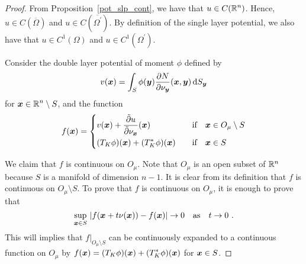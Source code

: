 \begin{proof}
From Proposition~\ref{pot_slp_cont}, we have that
$\displaystyle u \in C(\mathbb{R}^n)$.
Hence, $u \in C(\overline{\Omega})$ and
$\displaystyle u \in C(\overline{\Omega^{\prime}})$.  By definition of
the single layer potential, we also have that
$\displaystyle u \in C^1(\Omega)$ and
$\displaystyle u \in C^1(\Omega^{\prime})$.

Consider the double layer potential of moment $\phi$ defined by
\[
v({\bm{x}}) = \int_S \phi({\bm{y}})
\frac{\partial{N}}{\partial \nu_{{\bm{y}}}}({\bm{x}},{\bm{y}}) \,\mathrm{d}{S}_{{\bm{y}}}
\]
for $\displaystyle {\bm{x}} \in \mathbb{R}^n \setminus S$, and the function
\[
f({\bm{x}}) =
\begin{cases}
\displaystyle v({\bm{x}}) + \frac{\tilde{\partial}{u}}{\tilde{\partial}{\nu_{{\bm{x}}}}}({\bm{x}}) & \quad
\text{if} \quad {\bm{x}} \in O_\mu \setminus S \\[0.7em]
\displaystyle
(T_K\phi)({\bm{x}}) + (T^\ast_K\phi)({\bm{x}}) & \quad \text{if} \quad
{\bm{x}} \in S
\end{cases}
\]

 We claim that $f$ is continuous on $O_\mu$.  Note that
$O_\mu$ is an open subset of $\mathbb{R}^n$ because $S$ is a manifold of
dimension $n-1$.  It is clear
from its definition that $f$ is continuous on $O_\mu \setminus S$.
To prove that $f$ is continuous on $O_\mu$, it is enough to prove that
\[
\sup_{{\bm{x}}\in S}\,
\left| f({\bm{x}}+t\nu({\bm{x}})) - f({\bm{x}})\right| \rightarrow
0 \quad \text{as} \quad t \rightarrow 0 \ .
\]
This will implies that
$\displaystyle f\big|_{O_\mu \setminus S}$ can be
continuously expanded to a continuous function on $O_\mu$ by
$\displaystyle f({\bm{x}}) = (T_K\phi)({\bm{x}}) + (T^\ast_K\phi)({\bm{x}})$
for ${\bm{x}} \in S$.


\end{proof}
